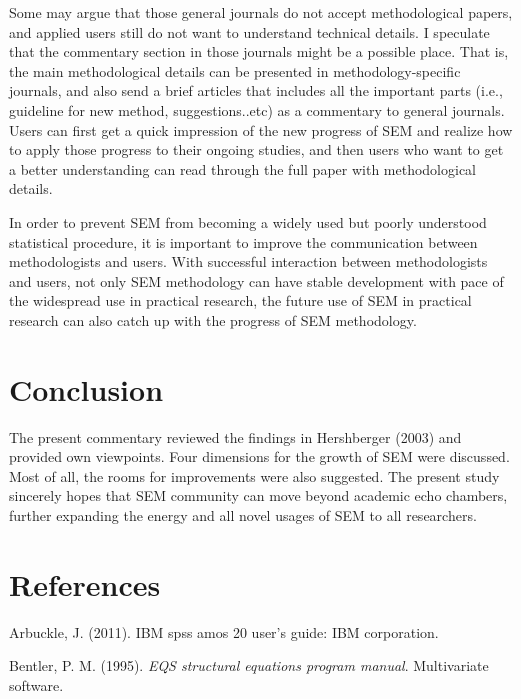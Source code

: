 \documentclass[jou]{apa6}
\theoremstyle{definition}
\theoremstyle{definition}
\theoremstyle{definition}
\theoremstyle{remark}
\begin{document}
Some may argue that those general journals do not accept methodological
papers, and applied users still do not want to understand technical
details. I speculate that the commentary section in those journals might
be a possible place. That is, the main methodological details can be
presented in methodology-specific journals, and also send a brief
articles that includes all the important parts (i.e., guideline for new
method, suggestions..etc) as a commentary to general journals. Users can
first get a quick impression of the new progress of SEM and realize how
to apply those progress to their ongoing studies, and then users who
want to get a better understanding can read through the full paper with
methodological details.

In order to prevent SEM from becoming a widely used but poorly
understood statistical procedure, it is important to improve the
communication between methodologists and users. With successful
interaction between methodologists and users, not only SEM methodology
can have stable development with pace of the widespread use in practical
research, the future use of SEM in practical research can also catch up
with the progress of SEM methodology.

\hypertarget{conclusion}{%
\section{Conclusion}\label{conclusion}}

\noindent The present commentary reviewed the findings in Hershberger
(2003) and provided own viewpoints. Four dimensions for the growth of
SEM were discussed. Most of all, the rooms for improvements were also
suggested. The present study sincerely hopes that SEM community can move
beyond academic echo chambers, further expanding the energy and all
novel usages of SEM to all researchers.

\newpage

\hypertarget{references}{%
\section{References}\label{references}}

\setlength{\parindent}{-0.5in}
\setlength{\leftskip}{0.5in}

\hypertarget{refs}{}
\leavevmode\hypertarget{ref-arbuckle2011ibm}{}%
Arbuckle, J. (2011). IBM spss amos 20 user's guide: IBM corporation.

\leavevmode\hypertarget{ref-bentler1995eqs}{}%
Bentler, P. M. (1995). \emph{EQS structural equations program manual}.
Multivariate software.
\end{document}
